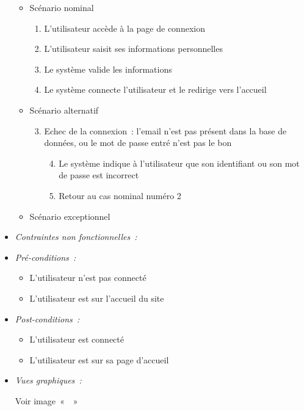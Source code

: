 \begin{itemize}
    \begin{itemize}
        \item Scénario nominal
        \begin{enumerate}
            \item L'utilisateur accède à la page de connexion
            \item L'utilisateur saisit ses informations personnelles
            \item Le système valide les informations
            \item Le système connecte l'utilisateur et le redirige vers l'accueil
        \end{enumerate}
        \item Scénario alternatif
            \begin{enumerate}[{1{a}.}]\setcounter{enumi}{2}
                \item Echec de la connexion~: l'email n'est pas présent dans la base de données, ou le mot de passe entré n'est pas le bon
                    \begin{enumerate}[{1.}]\setcounter{enumii}{3}
                        \item Le système indique à l'utilisateur que son identifiant ou son mot de passe est incorrect
                        \item Retour au cas nominal numéro 2
                    \end{enumerate}
            \end{enumerate}
        \item Scénario exceptionnel
    \end{itemize}

\item \textit{Contraintes non fonctionnelles~:}

\item \textit{Pré-conditions~:}

    \begin{itemize}
        \item L'utilisateur n'est pas connecté
        \item L'utilisateur est sur l'accueil du site
    \end{itemize}

\item \textit{Post-conditions~:}

    \begin{itemize}
        \item L'utilisateur est connecté
        \item L'utilisateur est sur sa page d'accueil
    \end{itemize}
    
\item \textit{Vues graphiques~:}

Voir image~«~~»

\end{itemize}

